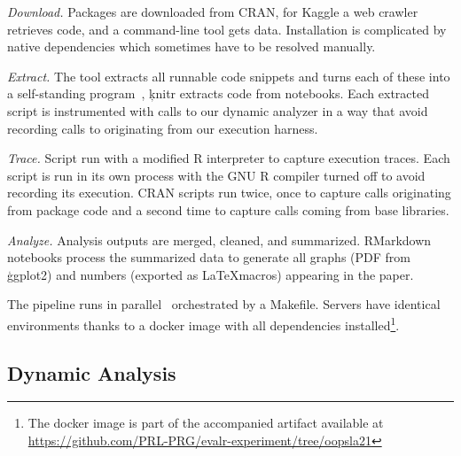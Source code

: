 \documentclass[screen,acmsmall]{acmart}
\begin{document}
\begin{compactenum}[(1)]
\item \emph{Download.} Packages are downloaded from CRAN, for Kaggle a web
  crawler retrieves code, and a command-line tool gets data. Installation is
  complicated by native dependencies which sometimes have to be resolved
  manually.
\item \emph{Extract.} The \genthat tool extracts all runnable code snippets and
  turns each of these into a self-standing program~\cite{issta18}, \c{knitr}
  extracts code from notebooks. Each extracted script is instrumented with calls
  to our dynamic analyzer in a way that avoid recording calls to \eval
  originating from our execution harness.
\item \emph{Trace.} Script run with a modified R interpreter to capture
  execution traces. Each script is run in its own process with the GNU R
  compiler turned off to avoid recording its execution. CRAN scripts run twice,
  once to capture \eval calls originating from package code and a second time to
  capture calls coming from base libraries.
\item \emph{Analyze.} Analysis outputs are merged, cleaned, and summarized.
  RMarkdown notebooks process the summarized data to generate all graphs (PDF
  from \c{ggplot2}) and numbers (exported as \LaTeX macros) appearing in the
  paper.
\end{compactenum} 

\vspace{1mm} 
\noindent The pipeline runs in parallel~\cite{GNUparallel}
orchestrated by a Makefile. Servers have identical environments thanks to a
docker image with all dependencies installed\footnote{The docker image is part
  of the accompanied artifact available at\\
\url{https://github.com/PRL-PRG/evalr-experiment/tree/oopsla21}}.

\subsection{Dynamic Analysis}
\end{document}
